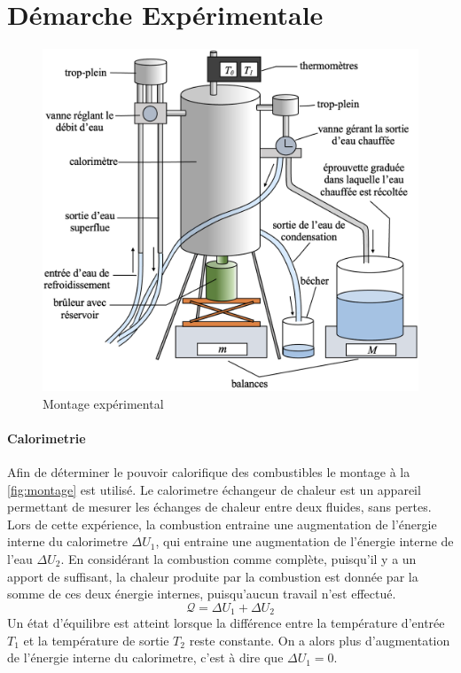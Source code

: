 \section{Démarche Expérimentale}

\begin{figure}
    \centering
    \includegraphics[width=\linewidth]{figures/montage.png}
    \caption{Montage expérimental \cite{rapport-mendels-pascaud}}
    \label{fig:montage}
\end{figure}

\paragraph*{Calorimetrie} Afin de déterminer le pouvoir calorifique des combustibles le montage à la \autoref{fig:montage} est utilisé. Le calorimetre échangeur de chaleur est un appareil permettant de mesurer les échanges de chaleur entre deux fluides, sans pertes. Lors de cette expérience, la combustion entraine une augmentation de l'énergie interne du calorimetre \(\Delta U_1\), qui entraine une augmentation de l'énergie interne de l'eau \(\Delta U_2\). En considérant la combustion comme complète, puisqu'il y a un apport de  suffisant, la chaleur produite par la combustion est donnée par la somme de ces deux énergie internes, puisqu'aucun travail n'est effectué.
\begin{equation}
    \mathcal{Q} = \Delta U_1 + \Delta U_2
\end{equation}
Un état d'équilibre est atteint lorsque la différence entre la température d'entrée \(T_1\) et la température de sortie \(T_2\) reste constante. On a alors plus d'augmentation de l'énergie interne du calorimetre, c'est à dire que \(\Delta U_1 = 0\).

